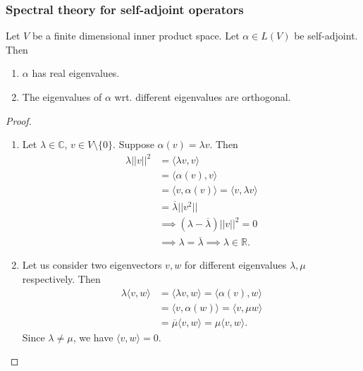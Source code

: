 \documentclass[a4paper]{scrartcl}
\begin{document}
\subsubsection{Spectral theory for self-adjoint operators}
\begin{lemma}
      Let $V$ be a finite dimensional inner product space. Let $\alpha \in L (V)$ be self-adjoint. Then
      \begin{enumerate}
           \item $\alpha $ has real eigenvalues.
           \item The eigenvalues of $\alpha$ wrt. different eigenvalues are orthogonal.
      \end{enumerate}
\end{lemma}
\begin{proof}
      \begin{enumerate}
           \item Let $\lambda \in \mathbb{C}$, $v \in V\setminus \{0\}$. Suppose $\alpha (v)= \lambda v$. Then 
           \begin{align*}
                \lambda ||v||^2&=\langle \lambda v,v \rangle\\
                &=\langle \alpha (v), v \rangle \\
                &=\langle v, \alpha (v) \rangle =\langle v,\lambda v \rangle \\&= \overline{\lambda} ||v^2||\\
                &\implies (\lambda-\overline{\lambda} )||v||^2=0\\
                &\implies \lambda=\overline{\lambda}  \implies \lambda \in \mathbb{R}.
           \end{align*}
           \item Let us consider two eigenvectors $v,w$ for different eigenvalues $\lambda, \mu $ respectively. Then
           \begin{align*}
                \lambda \langle v,w \rangle &=\langle \lambda v,w \rangle
                =\langle \alpha (v), w \rangle \\
                &=\langle v, \alpha (w) \rangle = \langle v, \mu w \rangle \\
                &=\overline{\mu} \langle v,w \rangle =\mu \langle v,w \rangle.
           \end{align*}
           Since $\lambda \neq \mu$, we have $\langle v,w \rangle =0$.
      \end{enumerate}
\end{proof}
\end{document}
